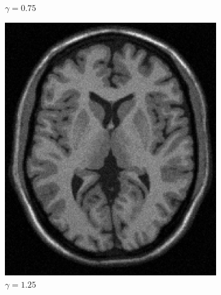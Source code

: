 \documentclass[11pt,twocolumn,twoside]{opticajnl}
\begin{document}
\begin{figure}[H]
\begin{subfigure}[h]{0.32\linewidth}
            \caption{$\gamma = 0.75$} 
         \end{subfigure}
         \begin{subfigure}[h]{0.32\linewidth}
            \centering
            \includegraphics[width=\textwidth]{Figuras/ImageA_exp_gamma=1.25.png}
            \caption{$\gamma = 1.25$} 
         \end{subfigure}
         \begin{subfigure}[h]{0.32\linewidth}
            \centering

\end{subfigure}
\end{figure}
\end{document}
